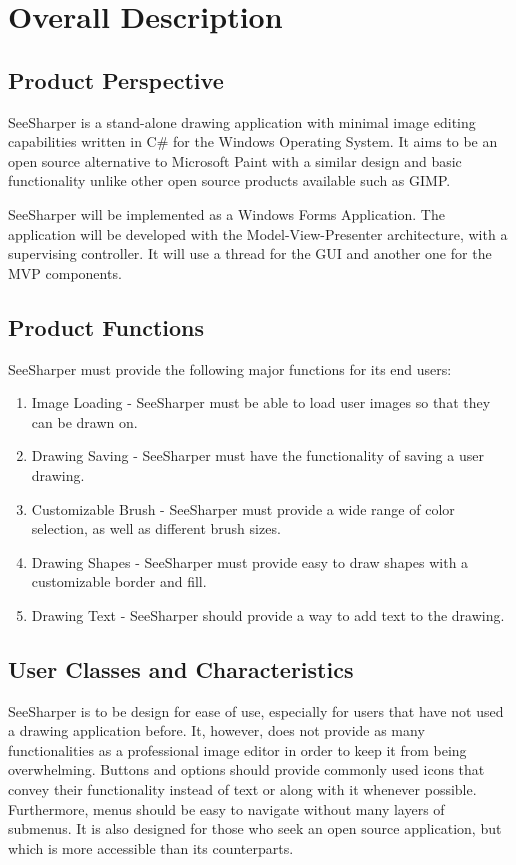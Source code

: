 \documentclass[12pt]{article}
\begin{document}
\section{Overall Description}
\subsection{Product Perspective}
SeeSharper is a stand-alone drawing application with minimal image editing capabilities written in C\# for the Windows Operating System. It aims to be an open source alternative to Microsoft Paint with a similar design and basic functionality unlike other open source products available such as GIMP.

SeeSharper will be implemented as a Windows Forms Application. The application will be developed with the Model-View-Presenter architecture, with a supervising controller. It will use a thread for the GUI and another one for the MVP components.
\subsection{Product Functions}
SeeSharper must provide the following major functions for its end users:
\begin{enumerate}
\item Image Loading - SeeSharper must be able to load user images so that they can be drawn on.
\item Drawing Saving - SeeSharper must have the functionality of saving a user drawing.
\item Customizable Brush - SeeSharper must provide a wide range of color selection, as well as different brush sizes.
\item Drawing Shapes - SeeSharper must provide easy to draw shapes with a customizable border and fill. 
\item Drawing Text - SeeSharper should provide a way to add text to the drawing.
\end{enumerate}
\subsection{User Classes and Characteristics}
SeeSharper is to be design for ease of use, especially for users that have not used a drawing application before. It, however, does not provide as many functionalities as a professional image editor in order to keep it from being overwhelming. Buttons and options should provide commonly used icons that convey their functionality instead of text or along with it whenever possible. Furthermore, menus should be easy to navigate without many layers of submenus. It is also designed for those who seek an open source application, but which is more accessible than its counterparts.
\end{document}
